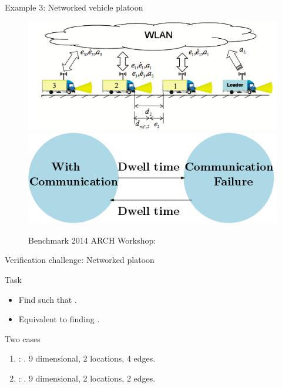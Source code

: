 \begin{frame}{Example 3: Networked vehicle platoon}
\begin{figure}
\caption*{\small Benchmark {\color{blue}  2014 ARCH Workshop}: }
\includegraphics[scale=0.4]{fig/VehiclePlatoon.png}\\
\includegraphics[scale=0.4]{fig/networked-platoon-model.png}
\end{figure}
\end{frame}

\begin{frame}{Verification challenge: Networked platoon}
\begin{alertblock}{Task}
\begin{itemize}
\item Find  such that .
\item Equivalent to finding .
\end{itemize}
\end{alertblock}
\pause
\begin{exampleblock}{Two cases}
\begin{enumerate}
\item {}: . {\color{violet} 9 dimensional, 2 locations, 4 edges}.
\item {}: . {\color{violet} 9 dimensional, 2 locations, 2 edges}.
\end{enumerate}
\end{exampleblock}
\end{frame}

